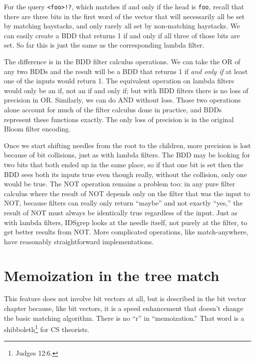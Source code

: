 \documentclass[twocolumn]{report}
\newcommand{\DangerousBend}{\marginpar{\large\hfill\dbend\hfill\null}}
\newcommand{\DangerousSection}{\marginpar{\large\hfill
\raisebox{-0.5\baselineskip}[0pt][0pt]{\dbend}\hfill\null}}
\begin{document}
For the query \texttt{<foo>!?}, which matches if and only if the head is
\texttt{foo}, recall that there are three bits in the first word of the
vector that will necessarily all be set by matching haystacks, and only rarely
all set by non-matching haystacks.  We can easily create a BDD that
returns 1 if and only if all three of those bits are set.  So far this is
just the same as the corresponding lambda filter.

The difference is in the BDD filter calculus operations.  We can take the OR
of any two BDDs and the result will be a BDD that returns 1 if \emph{and
only if} at least one of the inputs would return 1.  The equivalent
operation on lambda filters would only be an if, not an if and only if; but
with BDD filters there is no loss of precision in OR.  Similarly, we can do
AND without loss.  Those two operations alone account for much of the filter
calculus done in practice, and BDDs represent these functions exactly.  The
only loss of precision is in the original Bloom filter encoding.

Once we start shifting needles from the root to the children, more precision
is lost because of bit collisions, just as with lambda filters.  The BDD may
be looking for two bits that both ended up in the same place, so if that one
bit is set then the BDD sees both its inputs true even though really,
without the collision, only one would be true.  The NOT operation remains a
problem too: in any pure filter calculus where the result of NOT depends
only on the filter that was the input to NOT, because filters can really
only return ``maybe'' and not exactly ``yes,'' the result of NOT must
always be identically true regardless of the input.  Just as with lambda
filters, IDSgrep looks at the needle itself, not purely at the filter, to
get better results from NOT.  More complicated operations, like
match-anywhere, have reasonably straightforward implementations.


\section{Memoization in the tree match} %

This \DangerousBend feature does not involve bit vectors at all, but is
described in the bit vector chapter because, like bit vectors, it is a speed
enhancement that doesn't change the basic matching algorithm.  There is no
``r'' in ``memoization.'' That word is a shibboleth\footnote{Judges 12:6.}
for CS theorists.
\end{document}
